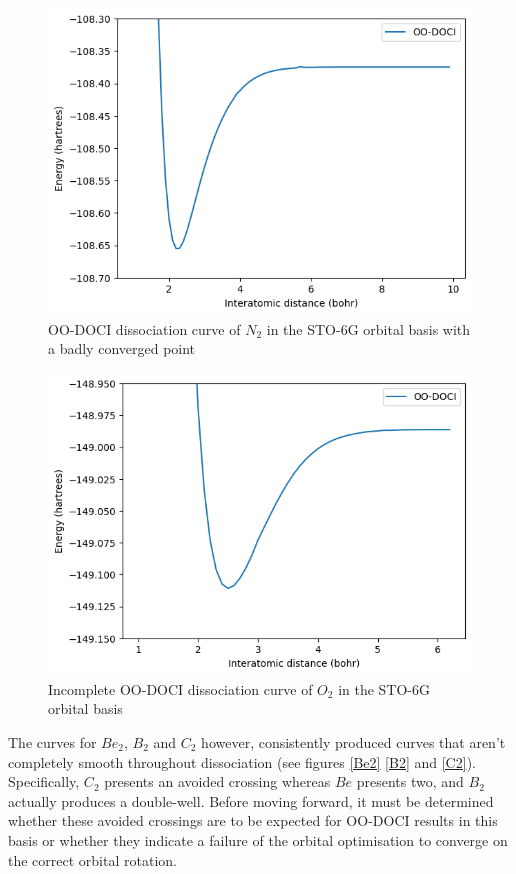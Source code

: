 \documentclass[twoside,twocolumn,9pt]{article}
\begin{document}
\begin{figure}
  \includegraphics[width=\linewidth]{N2.png}
  \caption{OO-DOCI dissociation curve of $N_2$ in the STO-6G orbital basis with a badly converged point}\label{N2}
\end{figure}


\begin{figure}
  \includegraphics[width=\linewidth]{O2.png}
  \caption{Incomplete OO-DOCI dissociation curve of $O_2$ in the STO-6G orbital basis}\label{O2}
\end{figure}

The curves for $Be_2$, $B_2$ and $C_2$ however, consistently produced curves that aren't completely smooth throughout dissociation (see figures \ref{Be2} \ref{B2} and \ref{C2}). Specifically, $C_2$ presents an avoided crossing whereas $Be$ presents two, and $B_2$ actually produces a double-well. Before moving forward, it must be determined whether these avoided crossings are to be expected for OO-DOCI results in this basis or whether they indicate a failure of the orbital optimisation to converge on the correct orbital rotation.
\end{document}
